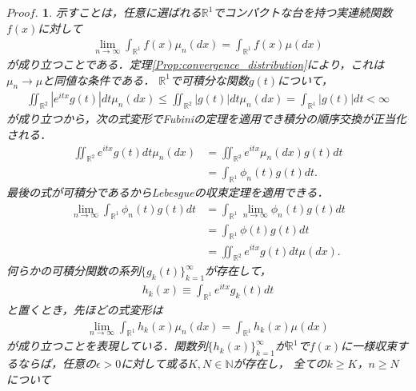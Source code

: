\documentclass[a4j,papersize,disablejfam,slide,14pt]{jsarticle}
\newtheorem{Proof}{$Proof.$}
\def\exp#1{e^{#1}} %
\begin{document}
    \begin{Proof}
    	示すことは，任意に選ばれる$\mathbb{R}^1$でコンパクトな台を持つ実連続関数$f(x)$に対して
        \begin{align}
        	\lim_{n \to \infty} \int_{\mathbb{R}^1} f(x) \mu_n(dx) = \int_{\mathbb{R}^1} f(x) \mu(dx)
        \end{align}
        が成り立つことである．定理{\ref{Prop:convergence_distribution}}により，これは$\mu_n \to \mu$と同値な条件である．
    	$\mathbb{R}^1$で可積分な関数$g(t)$について，
        \begin{align}
        	\iint_{\mathbb{R}^2} \left| \exp{itx} g(t) \right| dt \mu_n(dx) \leq \iint_{\mathbb{R}^2} \left| g(t) \right| dt \mu_n(dx) = \int_{\mathbb{R}^1} \left| g(t) \right| dt < \infty
        \end{align}
        が成り立つから，次の式変形で{\rm Fubini}の定理を適用でき積分の順序交換が正当化される．
        \begin{align}
        	\iint_{\mathbb{R}^2} \exp{itx} g(t) dt \mu_n(dx) &= \iint_{\mathbb{R}^2} \exp{itx} \mu_n(dx) g(t) dt \\
        	&= \int_{\mathbb{R}^1} \phi_n(t) g(t) dt.
        \end{align}
        最後の式が可積分であるから{\rm Lebesgue}の収束定理を適用できる．
        \begin{align}
        	\lim_{n \to \infty} \int_{\mathbb{R}^1} \phi_n(t) g(t) dt &= \int_{\mathbb{R}^1} \lim_{n \to \infty} \phi_n(t) g(t) dt \\
            &= \int_{\mathbb{R}^1} \phi(t) g(t) dt \\
            &= \iint_{\mathbb{R}^2} \exp{itx} g(t) dt \mu(dx).
        \end{align}
        何らかの可積分関数の系列$\{ g_k(t) \}_{k=1}^{\infty}$が存在して，
        \begin{align}
        	h_k(x) \equiv \int_{\mathbb{R}^1} \exp{itx} g_k(t) dt
        \end{align}
        と置くとき，先ほどの式変形は
        \begin{align}
        	\lim_{n \to \infty} \int_{\mathbb{R}^1} h_k(x) \mu_n(dx) = \int_{\mathbb{R}^1} h_k(x) \mu(dx)
        \end{align}
        が成り立つことを表現している．関数列$\{ h_k(x) \}_{k=1}^{\infty}$が$\mathbb{R}^1$で$f(x)$に一様収束するならば，任意の$\epsilon > 0$に対して或る$K,N \in \mathbb{N}$が存在し，
        全ての$k \geq K$，$n \geq N$について
        \begin{align}

\end{align}
\end{Proof}
\end{document}
